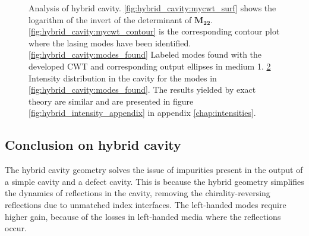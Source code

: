 \begin{figure}
\begin{subfigure}{0.49\textwidth}
\begin{subfigure}{\textwidth}
			\caption{}
			\label{fig:hybrid_cavity:intensity_distribution}
		\end{subfigure}
	\end{subfigure}
	\caption[Analysis of hybrid cavity]{Analysis of hybrid cavity. \ref{fig:hybrid_cavity:mycwt_surf} shows the logarithm of the invert of the determinant of $\bm{M_{22}}$. \ref{fig:hybrid_cavity:mycwt_contour} is the corresponding contour plot where the lasing modes have been identified. \ref{fig:hybrid_cavity:modes_found} Labeled modes found with the developed CWT and corresponding output ellipses in medium 1. \ref{fig:hybrid_cavity:intensity_distribution} Intensity distribution in the cavity for the modes in \ref{fig:hybrid_cavity:modes_found}. The results yielded by exact theory are similar and are presented in figure \ref{fig:hybrid_intensity_appendix} in appendix \ref{chap:intensities}.}
	\label{fig:hybrid_cavity:modes}
\end{figure}

\subsection{Conclusion on hybrid cavity}

The hybrid cavity geometry solves the issue of impurities present in the output of a simple cavity and a defect cavity. This is because the hybrid geometry simplifies the dynamics of reflections in the cavity, removing the chirality-reversing reflections due to unmatched index interfaces. The left-handed modes require higher gain, because of the losses in left-handed media where the reflections occur.